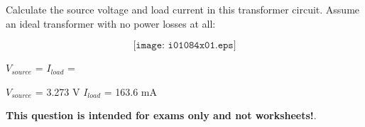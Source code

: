 

Calculate the source voltage and load current in this transformer circuit.  Assume an ideal transformer with no power losses at all:

$$\texttt{[image: i01084x01.eps]}$$

$V_{source}$ = \hskip 80pt $I_{load}$ =

\vskip 10pt







$V_{source}$ = 3.273 V \hskip 80pt $I_{load}$ = 163.6 mA







{\bf This question is intended for exams only and not worksheets!}.



